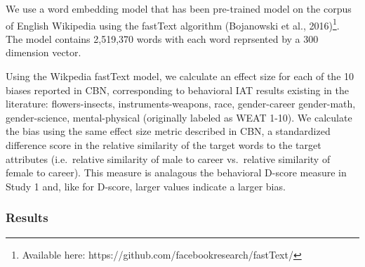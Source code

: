 \documentclass[10pt, letterpaper]{article}
\begin{document}
We use a word embedding model that has been pre-trained model on the
corpus of English Wikipedia using the fastText algorithm (Bojanowski et
al.,
2016)\footnote{Available here: https://github.com/facebookresearch/fastText/}.
The model contains 2,519,370 words with each word reprsented by a 300
dimension vector.

Using the Wikpedia fastText model, we calculate an effect size for each
of the 10 biases reported in CBN, corresponding to behavioral IAT
results existing in the literature: flowers-insects,
instruments-weapons, race, gender-career gender-math, gender-science,
mental-physical (originally labeled as WEAT 1-10). We calculate the bias
using the same effect size metric described in CBN, a standardized
difference score in the relative similarity of the target words to the
target attributes (i.e.~relative similarity of male to career
vs.~relative similarity of female to career). This measure is analagous
the behavioral D-score measure in Study 1 and, like for D-score, larger
values indicate a larger bias.

\subsubsection{Results}\label{results-1}
\end{document}
